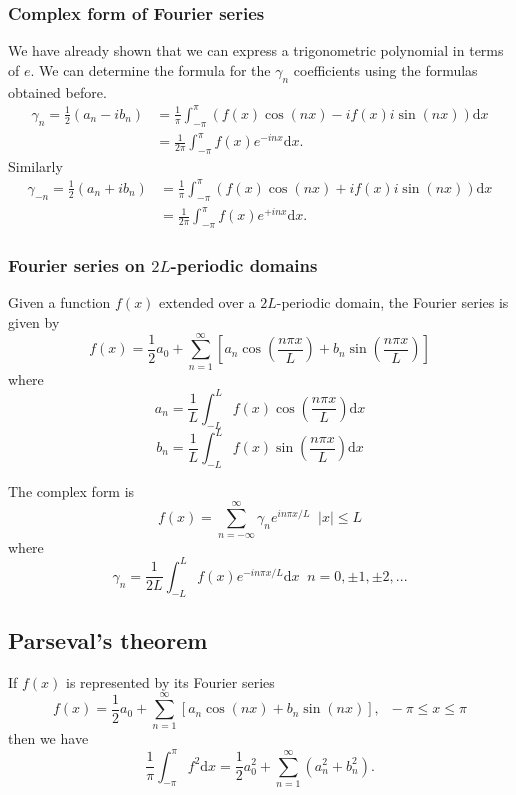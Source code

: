 \documentclass[11pt,a4paper]{article}
\newcommand\dee{\text{d}}
\theoremstyle{definition}
\begin{document}
\subsubsection{Complex form of Fourier series}
    We have already shown that we can express a trigonometric polynomial in terms of $ e $. 
    We can determine the formula for the $ \gamma_n $ coefficients using the formulas obtained before.
    \[\begin{split}
        \gamma_n = \frac{1}{2} (a_n - i b_n) &= \frac{1}{\pi} \int_{-\pi}^\pi \left(f(x)\cos(nx) - if(x)i\sin(nx)\right) \dee x \\
                                             &= \frac{1}{2\pi} \int_{-\pi}^\pi f(x)e^{-inx} \dee x.
    \end{split}
        \]
    Similarly
    \[\begin{split}
        \gamma_{-n} = \frac{1}{2} (a_n + i b_n) &= \frac{1}{\pi} \int_{-\pi}^\pi \left(f(x)\cos(nx) + if(x)i\sin(nx)\right) \dee x \\
                                             &= \frac{1}{2\pi} \int_{-\pi}^\pi f(x)e^{+inx} \dee x.
    \end{split}
        \]
\subsubsection{Fourier series on $2L$-periodic domains}

Given a function $ f(x) $ extended over a $2L$-periodic domain, the Fourier series is given by 
\[ f(x) = \frac{1}{2} a_0 + \sum_{n = 1}^\infty \left[a_n \cos\left(\frac{n\pi x}{L}\right) + b_n \sin\left(\frac{n\pi x}{L}\right)\right] \]
where 
\[ a_n = \frac{1}{L} \int_{-L}^L f(x)\cos\left(\frac{n\pi x}{L}\right) \dee x\]
\[ b_n = \frac{1}{L} \int_{-L}^L f(x)\sin\left(\frac{n\pi x}{L}\right) \dee x\]

The complex form is 
\[ f(x) = \sum_{n = -\infty}^\infty \gamma_n e^{in\pi x /L} \; \; |x| \leq L\]
where
\[ \gamma_n = \frac{1}{2L} \int_{-L}^L f(x) e^{-in\pi x /L}\dee x \; \; n = 0, \pm 1, \pm 2, ...\]

\subsection{Parseval's theorem}
If $ f(x) $ is represented by its Fourier series 
\[ f(x) = \frac{1}{2} a_0 + \sum_{n = 1}^\infty \left[a_n \cos(nx) + b_n \sin(nx)\right], \; \; -\pi \leq x \leq \pi \]
then we have
\[ \frac{1}{\pi} \int_{-\pi}^\pi f^2 \dee x = \frac{1}{2} a_0^2 + \sum_{n = 1}^\infty(a_n^2 + b_n^2).\]
\end{document}

